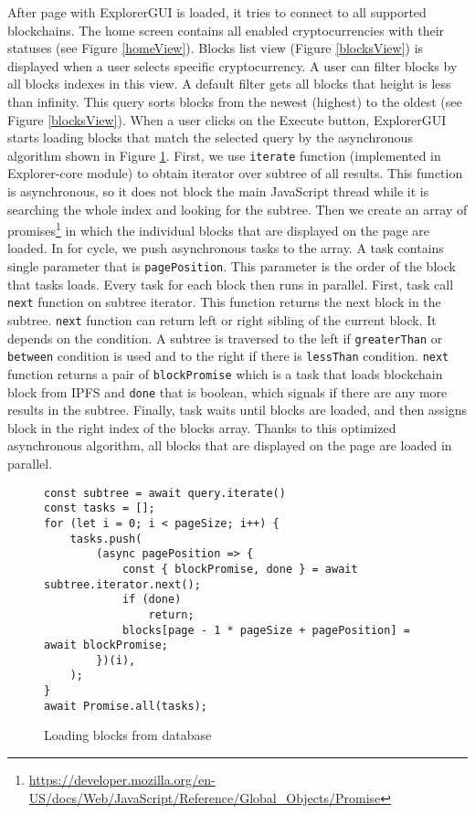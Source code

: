 After page with ExplorerGUI is loaded, it tries to connect to all supported blockchains. The home screen contains all enabled cryptocurrencies with their statuses (see Figure \ref{homeView}). Blocks list view (Figure \ref{blocksView}) is displayed when a user selects specific cryptocurrency. A user can filter blocks by all blocks indexes in this view. A default filter gets all blocks that height is less than infinity. This query sorts blocks from the newest (highest) to the oldest (see Figure \ref{blocksView}). When a user clicks on the Execute button, ExplorerGUI starts loading blocks that match the selected query by the asynchronous algorithm shown in Figure \ref{blocksLoading}. First, we use \texttt{iterate} function (implemented in Explorer-core module) to obtain iterator over subtree of all results. This function is asynchronous, so it does not block the main JavaScript thread while it is searching the whole index and looking for the subtree. Then we create an array of promises\footnote{\url{https://developer.mozilla.org/en-US/docs/Web/JavaScript/Reference/Global_Objects/Promise}} in which the individual blocks that are displayed on the page are loaded. In for cycle, we push asynchronous tasks to the array. A task contains single parameter that is \texttt{pagePosition}. This parameter is the order of the block that tasks loads. Every task for each block then runs in parallel. First, task call \texttt{next} function on subtree iterator. This function returns the next block in the subtree. \texttt{next} function can return left or right sibling of the current block. It depends on the condition. A subtree is traversed to the left if \texttt{greaterThan} or \texttt{between} condition is used and to the right if there is \texttt{lessThan} condition. \texttt{next} function returns a pair of \texttt{blockPromise} which is a task that loads blockchain block from IPFS and \texttt{done} that is boolean, which signals if there are any more results in the subtree. Finally, task waits until blocks are loaded, and then assigns block in the right index of the blocks array. Thanks to this optimized asynchronous algorithm, all blocks that are displayed on the page are loaded in parallel.

\begin{figure}[h]
    \centering
    \begin{lstlisting}[style=ES6]
const subtree = await query.iterate()
const tasks = [];
for (let i = 0; i < pageSize; i++) {
    tasks.push(
        (async pagePosition => {
            const { blockPromise, done } = await subtree.iterator.next();
            if (done)
                return;
            blocks[page - 1 * pageSize + pagePosition] = await blockPromise;
        })(i),
    );
}
await Promise.all(tasks);
    \end{lstlisting}
    \caption{Loading blocks from database}
    \label{blocksLoading}
\end{figure}



